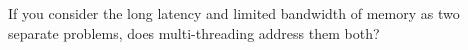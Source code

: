   If you consider the long latency and limited bandwidth of memory as
  two separate problems, does multi-threading address them both?
